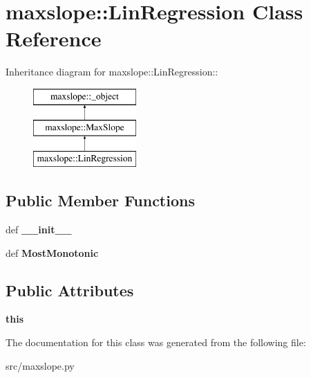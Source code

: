 \hypertarget{classmaxslope_1_1LinRegression}{
\section{maxslope::LinRegression Class Reference}
\label{d4/dbe/classmaxslope_1_1LinRegression}
}
Inheritance diagram for maxslope::LinRegression::\begin{figure}[H]
\begin{center}
\leavevmode
\includegraphics[height=3cm]{d4/dbe/classmaxslope_1_1LinRegression}
\end{center}
\end{figure}
\subsection*{Public Member Functions}
\begin{DoxyCompactItemize}
\item 
\hypertarget{classmaxslope_1_1LinRegression_ab45de3d79a109d5e052e219a102dbeec}{
def {\bfseries \_\-\_\-init\_\-\_\-}}
\label{d4/dbe/classmaxslope_1_1LinRegression_ab45de3d79a109d5e052e219a102dbeec}

\item 
\hypertarget{classmaxslope_1_1LinRegression_a963c3ebdaab1a12e99a6efc812de9226}{
def {\bfseries MostMonotonic}}
\label{d4/dbe/classmaxslope_1_1LinRegression_a963c3ebdaab1a12e99a6efc812de9226}

\end{DoxyCompactItemize}
\subsection*{Public Attributes}
\begin{DoxyCompactItemize}
\item 
\hypertarget{classmaxslope_1_1LinRegression_a359905ee6312345940c5ad51583acbc8}{
{\bfseries this}}
\label{d4/dbe/classmaxslope_1_1LinRegression_a359905ee6312345940c5ad51583acbc8}

\end{DoxyCompactItemize}


The documentation for this class was generated from the following file:\begin{DoxyCompactItemize}
\item 
src/maxslope.py\end{DoxyCompactItemize}
